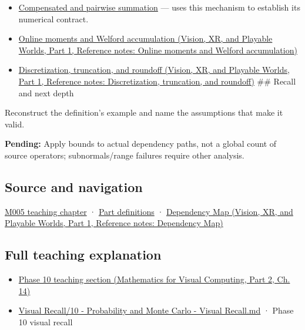 \hypertarget{appendix-f82e270791c8-used-by}{}

\begin{itemize}
\item
  \hyperref[appendix-df318da57389]{Compensated and pairwise summation} --- uses this mechanism to establish its numerical contract.
\item
  \href{../07-Vision-XR-and-Playable-Worlds-P01/main.pdf\#nameddest=appendix-33237f0f618b}{Online moments and Welford accumulation (Vision, XR, and Playable Worlds, Part 1, Reference notes: Online moments and Welford accumulation)}
\item
  \href{../07-Vision-XR-and-Playable-Worlds-P01/main.pdf\#nameddest=appendix-6b0648b2b8e8}{Discretization, truncation, and roundoff (Vision, XR, and Playable Worlds, Part 1, Reference notes: Discretization, truncation, and roundoff)} \#\# Recall and next depth
\end{itemize}

Reconstruct the definition's example and name the assumptions that make it valid.

\textbf{Pending:} Apply bounds to actual dependency paths, not a global count of source operators; subnormals/range failures require other analysis.

\subsection{Source and navigation}\label{appendix-f82e270791c8-source-and-navigation}

\hypertarget{appendix-f82e270791c8-source-and-navigation}{}

\hyperref[01-foundations-i-ch001-when-arithmetic-meets-uncertainty]{M005 teaching chapter} · \hyperref[appendix-fd090d982a15-m005---parts-77-88]{Part definitions} · \href{../07-Vision-XR-and-Playable-Worlds-P01/main.pdf\#nameddest=appendix-4ad47bdd269a}{Dependency Map (Vision, XR, and Playable Worlds, Part 1, Reference notes: Dependency Map)}

\subsection{Full teaching explanation}\label{appendix-f82e270791c8-full-teaching-explanation}

\hypertarget{appendix-f82e270791c8-full-teaching-explanation}{}

\begin{itemize}
\tightlist
\item
  \href{../02-Mathematics-for-Visual-Computing-P02/main.pdf\#nameddest=02-foundations-ii-ch030-finite-samples-need-stable-descriptive-statistics}{Phase 10 teaching section (Mathematics for Visual Computing, Part 2, Ch. 14)}
\item
  \hyperref[appendix-cb5af353ef77]{Visual Recall/10 - Probability and Monte Carlo - Visual Recall.md} · Phase 10 visual recall
\end{itemize}
